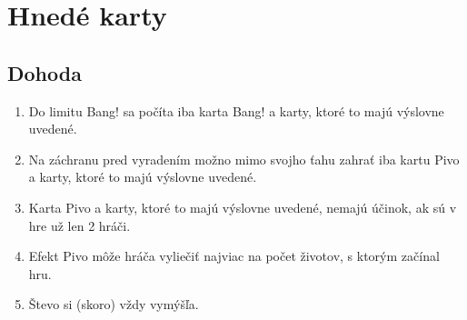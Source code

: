 \chapter{Hnedé karty}
\section*{Dohoda}
\begin{enumerate}
    \item Do limitu Bang! sa počíta iba karta Bang! a karty, ktoré to majú výslovne uvedené.

    \item Na záchranu pred vyradením možno mimo svojho ťahu zahrať iba kartu Pivo a karty, ktoré to majú výslovne uvedené.

    \item Karta Pivo a karty, ktoré to majú výslovne uvedené, nemajú účinok, ak sú v hre už len 2 hráči.

    \item Efekt Pivo môže hráča vyliečiť najviac na počet životov, s ktorým začínal hru.

    \item Števo si (skoro) vždy vymýšľa.
\end{enumerate}




